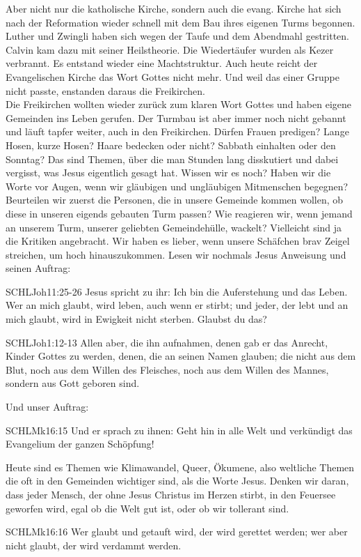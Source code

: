 \documentclass[14pt]{../../inc/mybib}
\newenvironment{block}[1][]{%
  \vspace{1.5em}%
  \noindent\textbf{#1}\par%
  \vspace{0.0em}%
}{%
  \vspace{1em}%
}
\begin{document}
\begin{block}
    Aber nicht nur die katholische Kirche, sondern auch die evang. Kirche hat sich nach der Reformation wieder schnell mit dem Bau ihres eigenen Turms begonnen.
    Luther und Zwingli haben sich wegen der Taufe und dem Abendmahl gestritten. Calvin kam dazu mit seiner Heilstheorie. Die Wiedertäufer wurden als Kezer verbrannt. Es entstand wieder eine Machtstruktur. Auch heute reicht der Evangelischen Kirche das Wort Gottes nicht mehr. Und weil das einer Gruppe nicht passte, enstanden daraus die Freikirchen.\\
    Die Freikirchen wollten wieder zurück zum klaren Wort Gottes und haben eigene Gemeinden ins Leben gerufen. Der Turmbau ist aber immer noch nicht gebannt und läuft tapfer weiter, auch in den Freikirchen. Dürfen Frauen predigen? Lange Hosen, kurze Hosen? Haare bedecken oder nicht? Sabbath einhalten oder den Sonntag? Das sind Themen, über die man Stunden lang disskutiert und dabei vergisst, was Jesus eigentlich gesagt hat. Wissen wir es noch? Haben wir die Worte vor Augen, wenn wir gläubigen und ungläubigen Mitmenschen begegnen? Beurteilen wir zuerst die Personen, die in unsere Gemeinde kommen wollen, ob diese in unseren eigends gebauten Turm passen? Wie reagieren wir, wenn jemand an unserem Turm, unserer geliebten Gemeindehülle, wackelt? Vielleicht sind ja die Kritiken angebracht. Wir haben es lieber, wenn unsere Schäfchen brav Zeigel streichen, um hoch hinauszukommen.
    Lesen wir nochmals Jesus Anweisung und seinen Auftrag:
    \begin{bibelbox}{SCHL}{Joh}{11:25-26}
        Jesus spricht zu ihr: Ich bin die Auferstehung und das Leben. Wer an mich glaubt, wird leben, auch wenn er stirbt; und jeder, der lebt und an mich glaubt, wird in Ewigkeit nicht sterben. Glaubst du das?
    \end{bibelbox} 
    \begin{bibelbox}{SCHL}{Joh}{1:12-13}
        Allen aber, die ihn aufnahmen, denen gab er das Anrecht, Kinder Gottes zu werden, denen, die an seinen Namen glauben;
        die nicht aus dem Blut, noch aus dem Willen des Fleisches, noch aus dem Willen des Mannes, sondern aus Gott geboren sind.
    \end{bibelbox}     
    Und unser Auftrag:
    \begin{bibelbox}{SCHL}{Mk}{16:15}
        Und er sprach zu ihnen: Geht hin in alle Welt und verkündigt das Evangelium der ganzen Schöpfung!
    \end{bibelbox} 
    Heute sind es Themen wie Klimawandel, Queer, Ökumene, also weltliche Themen die oft in den Gemeinden wichtiger sind, als die Worte Jesus. Denken wir daran, dass jeder Mensch, der ohne Jesus Christus im Herzen stirbt, in den Feuersee geworfen wird, egal ob die Welt gut ist, oder ob wir tollerant sind. 
    \begin{bibelbox}{SCHL}{Mk}{16:16}
        Wer glaubt und getauft wird, der wird gerettet werden; wer aber nicht glaubt, der wird verdammt werden.
    \end{bibelbox} 
\end{block}
\end{document}
